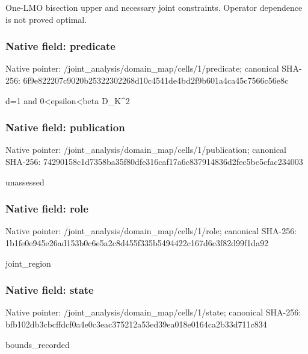 \documentclass[10pt,a4paper]{article}
\begin{document}
\begingroup\raggedright\sloppy One-LMO bisection upper and necessary joint constraints. Operator dependence is not proved optimal.\par\endgroup

\subsubsection{Native field: predicate}
Native pointer: /joint\_\allowbreak{}analysis/domain\_\allowbreak{}map/cells/1/predicate; canonical SHA-256: 6f9e822207c9020b25322302268d10c4541de4bd2f9b601a4ca45c7566c56e8c

\begingroup\raggedright\sloppy d=\allowbreak{}1 and 0<epsilon<beta D\_\allowbreak{}K\textasciicircum{}2\par\endgroup

\subsubsection{Native field: publication}
Native pointer: /joint\_\allowbreak{}analysis/domain\_\allowbreak{}map/cells/1/publication; canonical SHA-256: 74290158c1d7358ba35f80dfe316caf17a6c837914836d2fec5bc5cfac234003

\begingroup\raggedright\sloppy unassessed\par\endgroup

\subsubsection{Native field: role}
Native pointer: /joint\_\allowbreak{}analysis/domain\_\allowbreak{}map/cells/1/role; canonical SHA-256: 1b1fe0e945e26ad153b0c6e5a2c8d455f335b5494422c167d6c3f82d99f1da92

\begingroup\raggedright\sloppy joint\_\allowbreak{}region\par\endgroup

\subsubsection{Native field: state}
Native pointer: /joint\_\allowbreak{}analysis/domain\_\allowbreak{}map/cells/1/state; canonical SHA-256: bfb102db3cbcffdcf0a4e0c3eac375212a53ed39ea018e0164ca2b33d711c834

\begingroup\raggedright\sloppy bounds\_\allowbreak{}recorded\par\endgroup
\end{document}
